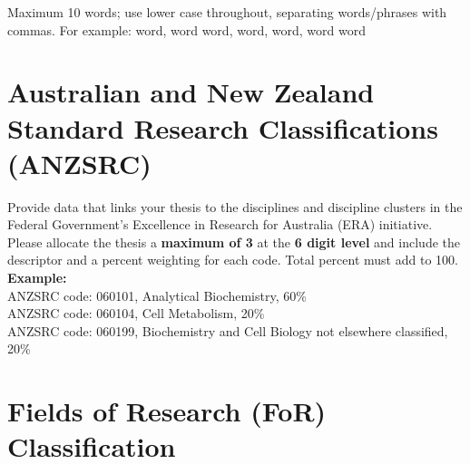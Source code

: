 \begin{instructional}
	Maximum 10 words; use lower case throughout, separating words/phrases with commas. For example: word, word word, word, word, word word
\end{instructional}




\section*{Australian and New Zealand Standard Research Classifications (ANZSRC)}

\begin{instructional}
    Provide data that links your thesis to the disciplines and discipline clusters in the Federal Government’s Excellence in Research for Australia (ERA) initiative.\\
    
    \noindent
    Please allocate the thesis a \textbf{maximum of 3} \href{http://www.abs.gov.au/Ausstats/abs@.nsf/Latestproducts/6BB427AB9696C225CA2574180004463E?opendocument}{\color{blue}{Australian and New Zealand Standard Research Classifications (ANZSRC) codes}} at the \textbf{6 digit level} and include the descriptor and a percent weighting for each code. Total percent must add to 100.\\


\textbf{Example:}\\


    ANZSRC code: 060101, Analytical Biochemistry, 60\% \\
    \indent ANZSRC code: 060104, Cell Metabolism, 20\% \\
    \indent ANZSRC code: 060199, Biochemistry and Cell Biology not elsewhere classified, 20\%
\end{instructional}





\section*{Fields of Research (FoR) Classification}

    
